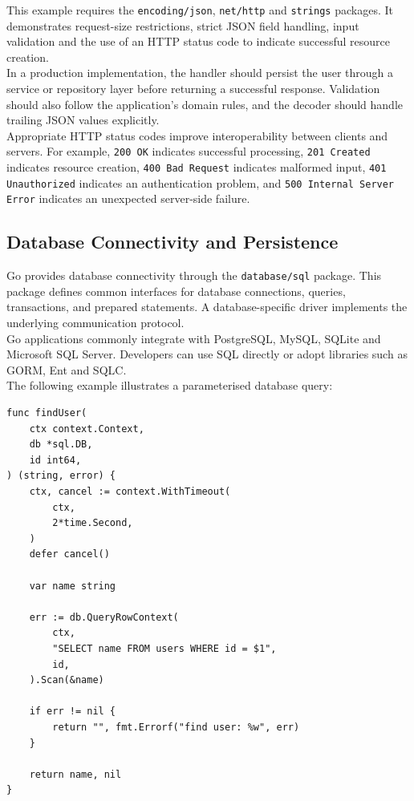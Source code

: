 This example requires the \texttt{encoding/json}, \texttt{net/http} and \texttt{strings} packages. It demonstrates request-size restrictions, strict JSON field handling, input validation and the use of an HTTP status code to indicate successful resource creation.\\

In a production implementation, the handler should persist the user through a service or repository layer before returning a successful response. Validation should also follow the application's domain rules, and the decoder should handle trailing JSON values explicitly.\\

Appropriate HTTP status codes improve interoperability between clients and servers. For example, \texttt{200 OK} indicates successful processing, \texttt{201 Created} indicates resource creation, \texttt{400 Bad Request} indicates malformed input, \texttt{401 Unauthorized} indicates an authentication problem, and \texttt{500 Internal Server Error} indicates an unexpected server-side failure.\\

\subsection{Database Connectivity and Persistence}

Go provides database connectivity through the \texttt{database/sql} package. This package defines common interfaces for database connections, queries, transactions, and prepared statements. A database-specific driver implements the underlying communication protocol.\\

Go applications commonly integrate with PostgreSQL, MySQL, SQLite and Microsoft SQL Server. Developers can use SQL directly or adopt libraries such as GORM, Ent and SQLC.\\

The following example illustrates a parameterised database query:

\begin{lstlisting}
func findUser(
    ctx context.Context,
    db *sql.DB,
    id int64,
) (string, error) {
    ctx, cancel := context.WithTimeout(
        ctx,
        2*time.Second,
    )
    defer cancel()

    var name string

    err := db.QueryRowContext(
        ctx,
        "SELECT name FROM users WHERE id = $1",
        id,
    ).Scan(&name)

    if err != nil {
        return "", fmt.Errorf("find user: %w", err)
    }

    return name, nil
}
\end{lstlisting}

